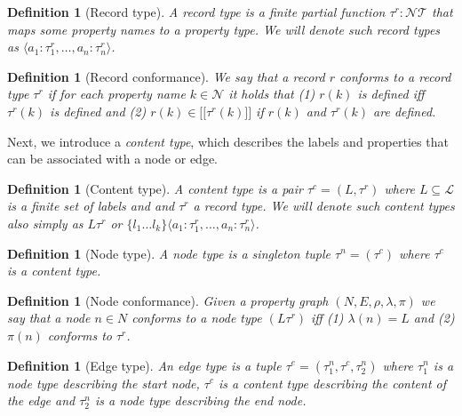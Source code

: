 \documentclass[a4paper]{article}
\makeatletter
\newtheorem{definition}[theorem]{Definition}
\newcommand{\rtype}{\tau^r}
\newcommand{\ctype}{\tau^c}
\newcommand{\ntype}{\tau^n}
\newcommand{\etype}{\tau^e}
\newcommand{\lsem}{\ensuremath{[\![}}
\newcommand{\rsem}{\ensuremath{]\!]}}
\newcommand{\sem}[1]{\ensuremath{\lsem #1 \rsem}}
\newcommand{\pto}{}%
\DeclareRobustCommand{\pto}{\mathrel{\mathpalette\p@to@gets\to}}
\newcommand{\p@to@gets}[2]{%
  \ooalign{\hidewidth$\m@th#1\mapstochar\mkern5mu$\hidewidth\cr$\m@th#1\to$\cr}%
}
\makeatother
\begin{document}
\begin{definition}[Record type]
  A \emph{record type} is a finite partial function $\rtype : \mathcal{N} \pto \mathcal{T}$ that maps some property names to a property type. We will denote such record types as $\langle a_1 : \rtype_1, \ldots, a_n : \rtype_n \rangle$.
\end{definition}

\begin{definition}[Record conformance]
  We say that a record $r$ \emph{conforms} to a record type $\rtype$ if for each property name $k \in \mathcal{N}$ it holds that (1) $r(k)$ is defined iff $\rtype(k)$ is defined and (2) $r(k) \in \sem{\rtype(k)}$ if $r(k)$ and $\rtype(k)$ are defined.
\end{definition}

Next, we introduce a \emph{content type}, which describes the labels and properties that can be associated with a node or edge.

\begin{definition}[Content type]
  A \emph{content type} is a pair $\ctype = (L, \rtype)$ where $L \subseteq \mathcal{L}$ is a finite set of labels and and $\rtype$ a record type. We will denote such content types also simply as $L \rtype$ or $\{ l_1 \ldots l_k \} \langle a_1 : \rtype_1, \ldots, a_n : \rtype_n \rangle$.
\end{definition}

\begin{definition}[Node type]
  A \emph{node type} is a singleton tuple $\ntype = (\ctype)$ where $\ctype$ is a content type.
\end{definition}

\begin{definition}[Node conformance]
  Given a property graph $(N, E, \rho, \lambda, \pi)$ we say that a node $n \in N$ \emph{conforms} to a node type $(L\rtype)$ iff (1) $\lambda(n) = L$ and (2) $\pi(n)$ conforms to $\rtype$.
\end{definition}

\begin{definition}[Edge type]
  An \emph{edge type} is a tuple $\etype = (\ntype_1, \ctype, \ntype_2)$ where $\ntype_1$ is a node type describing the start node, $\ctype$ is a content type describing the content of the edge and $\ntype_2$ is a node type describing the end node.
\end{definition}
  
\end{document}
